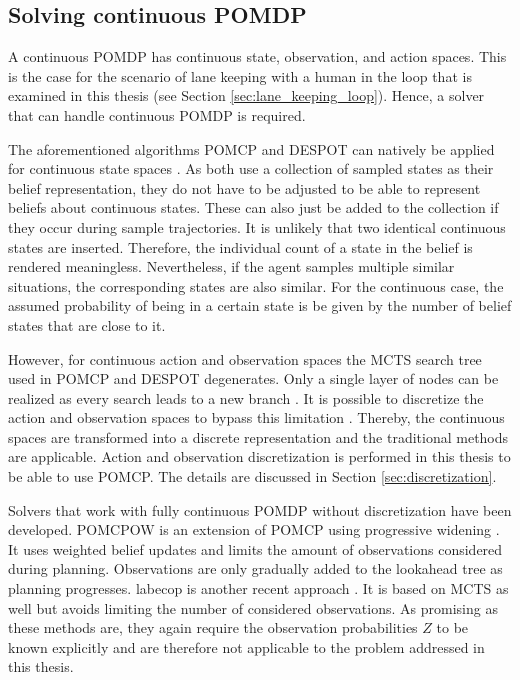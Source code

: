 \subsection{Solving continuous POMDP}

A continuous POMDP has continuous state, observation, and action spaces. This is the case for the scenario of lane keeping with a human in the loop that is examined in this thesis (see Section \ref{sec:lane_keeping_loop}). Hence, a solver that can handle continuous POMDP is required.

The aforementioned algorithms POMCP and DESPOT can natively be applied for continuous state spaces \parencite{pomcp_continuous}. As both use a collection of sampled states as their belief representation, they do not have to be adjusted to be able to represent beliefs about continuous states. These can also just be added to the collection if they occur during sample trajectories. It is unlikely that two identical continuous states are inserted. Therefore, the individual count of a state in the belief is rendered meaningless. Nevertheless, if the agent samples multiple similar situations, the corresponding states are also similar. For the continuous case, the assumed probability of being in a certain state is be given by the number of belief states that are close to it.

However, for continuous action and observation spaces the MCTS search tree used in POMCP and DESPOT degenerates. Only a single layer of nodes can be realized as every search leads to a new branch \parencite{online_pomdp_cont}. It is possible to discretize the action and observation spaces to bypass this limitation \parencite{pomcp_continuous}. Thereby, the continuous spaces are transformed into a discrete representation and the traditional methods are applicable. Action and observation discretization is performed in this thesis to be able to use POMCP. The details are discussed in Section \ref{sec:discretization}.

Solvers that work with fully continuous POMDP without discretization have been developed. POMCPOW is an extension of POMCP using progressive widening \parencite{online_pomdp_cont}. It uses weighted belief updates
and limits the amount of observations considered during planning. Observations are only gradually added to the lookahead tree as planning progresses. \gls{labecop} is another recent approach \parencite{online-cont-pomdp-2}. It is based on MCTS as well but avoids limiting the number of considered observations. As promising as these methods are, they again require the observation probabilities $Z$ to be known explicitly and are therefore not applicable to the problem addressed in this thesis.


